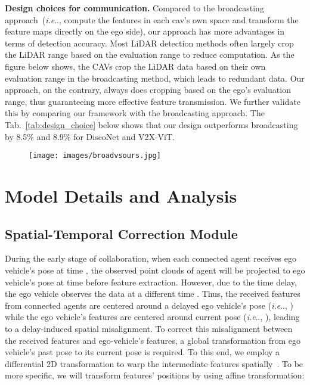 \documentclass[runningheads]{llncs}
\makeatletter
\DeclareRobustCommand\onedot{\futurelet\@let@token\@onedot}
\def\@onedot{\ifx\@let@token.\else.\null\fi\xspace}
\def\ie{\emph{i.e}\onedot} \def\Ie{\emph{I.e}\onedot}
\makeatother
\begin{document}
\noindent\textbf{Design choices for communication. }
Compared to the broadcasting approach~(\ie, compute the features in each cav's own space and transform the feature maps directly on the ego side), our approach has more advantages in terms of detection accuracy. Most LiDAR detection methods often largely crop the LiDAR range based on the evaluation range to reduce computation. As the figure below shows, the CAVs crop the LiDAR data based on their own evaluation range in the broadcasting method, which leads to redundant data. Our approach, on the contrary, always does cropping based on the ego's evaluation range, thus guaranteeing more effective feature transmission. We further validate this by comparing our framework with the broadcasting approach. The Tab.~\ref{tab:design_choice} below shows that our design outperforms broadcasting by 8.5\% and 8.9\% for DiscoNet and V2X-ViT.
\begin{figure}[h]
\centering
\texttt{[image: images/broadvsours.jpg]}
\label{fig:broadcast}
\end{figure}


\section{Model Details and Analysis}
\label{sec:model-details}

\subsection{Spatial-Temporal Correction Module}
\label{sec:stcm}
During the early stage of collaboration, when each connected agent  receives ego vehicle's pose at time , the observed point clouds of agent  will be projected to ego vehicle's pose  at time  before feature extraction. However, due to the time delay, the ego vehicle observes the data at a different time . Thus, the received features from connected agents are centered around a delayed ego vehicle's pose (\ie, ) while the ego vehicle's features are centered around current pose (\ie, ), leading to a delay-induced spatial misalignment. To correct this misalignment between the received features and ego-vehicle's features, a global transformation  from ego vehicle's past pose  to its current pose  is required. To this end, we employ a differential 2D transformation  to warp the intermediate features spatially~\cite{jaderberg2015spatial}. To be more specific, we will transform features' positions by using affine transformation:
\end{document}
